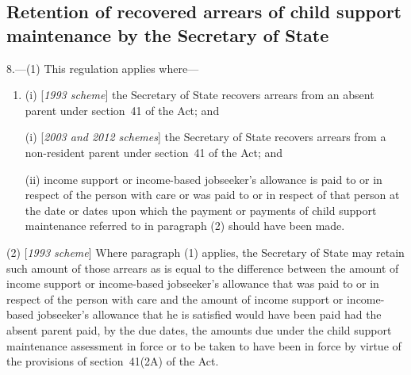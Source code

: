 \documentclass[12pt,a4paper]{article}
\begin{document}
%

\subsection[8. Retention of recovered arrears of child support maintenance by the Secretary of State]{\sloppy Retention of recovered arrears of child support maintenance by the Secretary of State}

8.—(1) This regulation applies where—
\begin{enumerate}\item[]
(i) [\emph{1993 scheme}] the Secretary of State recovers arrears from an absent parent under section~41 of the Act; and

(i) [\emph{2003 and 2012 schemes}] the Secretary of State recovers arrears from 
a non-resident parent  %
under section~41 of the Act; and

(ii) income support
or income-based jobseeker’s allowance  %
is paid to or in respect of the person with care or was paid to or in respect of that person at the date or dates upon which the payment or payments of child support maintenance referred to in paragraph (2) should have been made.
\end{enumerate}

(2) [\emph{1993 scheme}] Where paragraph (1) applies, the Secretary of State may retain such amount of those arrears as is equal to the difference between the amount of income support 
or income-based jobseeker’s allowance  %
that was paid to or in respect of the person with care and the amount of income support 
or income-based jobseeker’s allowance  %
that he is satisfied would have been paid had the absent parent paid, by the due dates, the amounts due under the child support maintenance assessment in force or to be taken to have been in force by virtue of the provisions of section~41(2A) of the Act.
\end{document}
